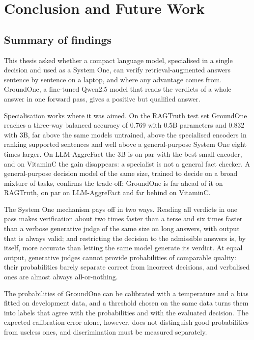 \chapter{Conclusion and Future Work}
\label{sec:conclusion}

\section{Summary of findings}
\label{sec:concl-summary}

This thesis asked whether a compact language model, specialised in a single decision and used as a System One, can
verify retrieval-augmented answers sentence by sentence on a laptop, and where any advantage comes from. GroundOne, a
fine-tuned Qwen2.5 model that reads the verdicts of a whole answer in one forward pass, gives a positive but qualified
answer.

Specialisation works where it was aimed. On the RAGTruth test set GroundOne reaches a three-way balanced accuracy of
0.769 with 0.5B parameters and 0.832 with 3B, far above the same models untrained, above the specialised encoders in
ranking supported sentences and well above a general-purpose System One eight times larger. On LLM-AggreFact the 3B is on
par with the best small encoder, and on VitaminC the gain disappears: a specialist is not a general fact checker. A
general-purpose decision model of the same size, trained to decide on a broad mixture of tasks, confirms the trade-off:
GroundOne is far ahead of it on RAGTruth, on par on LLM-AggreFact and far behind on VitaminC.

The System One mechanism pays off in two ways. Reading all verdicts in one pass makes verification about two times
faster than a terse and six times faster than a verbose generative judge of the same size on long answers, with output
that is always valid; and restricting the decision to the admissible answers is, by itself, more accurate than letting
the same model generate its verdict. At equal output, generative judges cannot provide probabilities of comparable
quality: their probabilities barely separate correct from incorrect decisions, and verbalised ones are almost always
all-or-nothing.

The probabilities of GroundOne can be calibrated with a temperature and a bias fitted on development data, and a
threshold chosen on the same data turns them into labels that agree with the probabilities and with the evaluated
decision. The expected calibration error alone, however, does not distinguish good probabilities from useless ones, and
discrimination must be measured separately.

